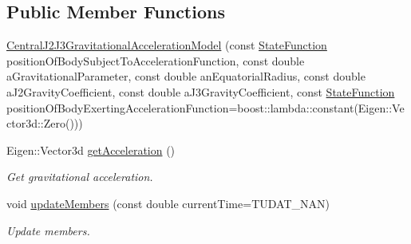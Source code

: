 \subsection*{Public Member Functions}
\begin{DoxyCompactItemize}
\item 
\hyperlink{classtudat_1_1gravitation_1_1CentralJ2J3GravitationalAccelerationModel_a807869026329ad24b84e7829d42eccec}{Central\+J2\+J3\+Gravitational\+Acceleration\+Model} (const \hyperlink{classtudat_1_1gravitation_1_1SphericalHarmonicsGravitationalAccelerationModelBase_a4ca706c4f941be481fc5f490e49390d8}{State\+Function} position\+Of\+Body\+Subject\+To\+Acceleration\+Function, const double a\+Gravitational\+Parameter, const double an\+Equatorial\+Radius, const double a\+J2\+Gravity\+Coefficient, const double a\+J3\+Gravity\+Coefficient, const \hyperlink{classtudat_1_1gravitation_1_1SphericalHarmonicsGravitationalAccelerationModelBase_a4ca706c4f941be481fc5f490e49390d8}{State\+Function} position\+Of\+Body\+Exerting\+Acceleration\+Function=boost\+::lambda\+::constant(Eigen\+::\+Vector3d\+::\+Zero()))
\item 
Eigen\+::\+Vector3d \hyperlink{classtudat_1_1gravitation_1_1CentralJ2J3GravitationalAccelerationModel_a5b067a8787c813b6b08a5b83a3f415f9}{get\+Acceleration} ()
\begin{DoxyCompactList}\small\item\em Get gravitational acceleration. \end{DoxyCompactList}\item 
void \hyperlink{classtudat_1_1gravitation_1_1CentralJ2J3GravitationalAccelerationModel_aa9cfafbe11efb4a60bb87ee5c6c06e1a}{update\+Members} (const double current\+Time=T\+U\+D\+A\+T\+\_\+\+N\+AN)
\begin{DoxyCompactList}\small\item\em Update members. \end{DoxyCompactList}\end{DoxyCompactItemize}
